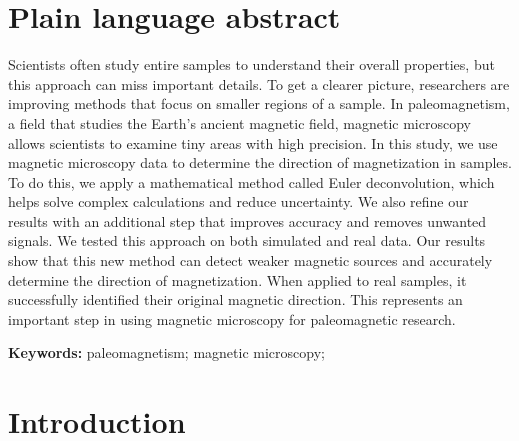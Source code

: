 \documentclass[onecolumn,12pt,a4paper]{article}
\newcommand{\Keywords}{%
  paleomagnetism; magnetic microscopy;
}
\begin{document}
\section*{Plain language abstract}

Scientists often study entire samples to understand their overall properties, but this approach can miss important details. To get a clearer picture, researchers are improving methods that focus on smaller regions of a sample. In paleomagnetism, a field that studies the Earth's ancient magnetic field, magnetic microscopy allows scientists to examine tiny areas with high precision. In this study, we use magnetic microscopy data to determine the direction of magnetization in samples. To do this, we apply a mathematical method called Euler deconvolution, which helps solve complex calculations and reduce uncertainty. We also refine our results with an additional step that improves accuracy and removes unwanted signals. We tested this approach on both simulated and real data. Our results show that this new method can detect weaker magnetic sources and accurately determine the direction of magnetization. When applied to real samples, it successfully identified their original magnetic direction. This represents an important step in using magnetic microscopy for paleomagnetic research.

\vspace{0.5cm}
\noindent
\textbf{Keywords:} \Keywords{}

\section{Introduction}
\end{document}
